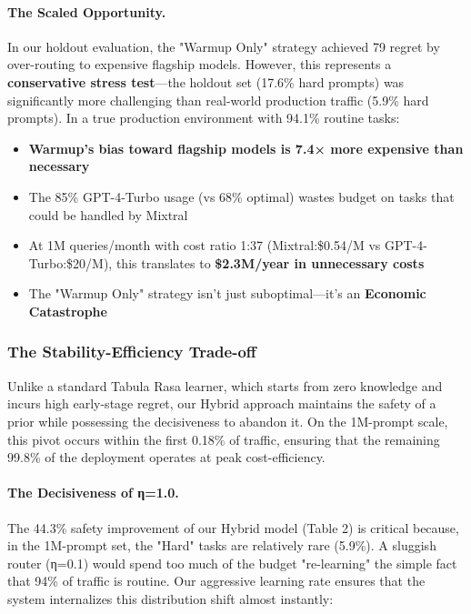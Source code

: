 \paragraph{The Scaled Opportunity.}
In our holdout evaluation, the "Warmup Only" strategy achieved 79 regret by over-routing to expensive flagship models. However, this represents a \textbf{conservative stress test}—the holdout set (17.6\% hard prompts) was significantly more challenging than real-world production traffic (5.9\% hard prompts). In a true production environment with 94.1\% routine tasks:

\begin{itemize}[leftmargin=*,nosep]
    \item \textbf{Warmup's bias toward flagship models is 7.4× more expensive than necessary}
    \item The 85\% GPT-4-Turbo usage (vs 68\% optimal) wastes budget on tasks that could be handled by Mixtral
    \item At 1M queries/month with cost ratio 1:37 (Mixtral:\$0.54/M vs GPT-4-Turbo:\$20/M), this translates to \textbf{\$2.3M/year in unnecessary costs}
    \item The "Warmup Only" strategy isn't just suboptimal—it's an \textbf{Economic Catastrophe}
\end{itemize}

\subsubsection{The Stability-Efficiency Trade-off}

Unlike a standard Tabula Rasa learner, which starts from zero knowledge and incurs high early-stage regret, our Hybrid approach maintains the safety of a prior while possessing the decisiveness to abandon it. On the 1M-prompt scale, this pivot occurs within the first 0.18\% of traffic, ensuring that the remaining 99.8\% of the deployment operates at peak cost-efficiency.

\paragraph{The Decisiveness of η=1.0.}
The 44.3\% safety improvement of our Hybrid model (Table 2) is critical because, in the 1M-prompt set, the "Hard" tasks are relatively rare (5.9\%). A sluggish router (η=0.1) would spend too much of the budget "re-learning" the simple fact that 94\% of traffic is routine. Our aggressive learning rate ensures that the system internalizes this distribution shift almost instantly:

